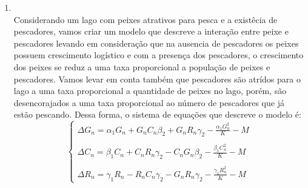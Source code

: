 \documentclass[a4paper]{article}
\begin{document}
\begin{enumerate}
$K$ \'e a capacidade de suporte do meio;\\
$M$ \'e a quantidade de indiv\'iduos que morrem por causas naturais (velhice, doen\c{c}a, cat\'astrofes, etc.).\\
\\
Os coeficientes $\alpha_1, \beta_1, \gamma_1$ representam a taxa de natalidade da espe\'ecie.\\
O efeito produzido pelo aparecimento de uma outra esp\'ecie, competi\c{c}\~ao inter-espec\'ifica, \'e proporcional ao produto dos termos das esp\'ecies multiplicado pelo fator de decrescimento da esp\'ecia presa. Neste modelo, estou supondo que o decrescimento ($\alpha_2, \beta_2, \gamma_2 $) n\~ao muda mesmo mudando a esp\'ecie predadora.\\
O coeficiente $\frac{P ^2}{K}$, onde $P$ \'e uma popula\c{c}\~ao qualquer, mede o efeito do crescimento de uma popula\c{c}\~ao pelo acr\'escimo de um novo indiv\'iduo.\\
Uma observa\c{c}\~ao relevante para a simula\c{c}\~ao do modelo \'e o valor dado aos coeficientes $\alpha$, $\beta$ e $\gamma$, pois cada esp\'ecie pode ter a capacidade de excluir a outra.\\
No caso de n\~ao existirem predadores, as presas crescem at\'e se estabilizarem devido a capacidade de suporte.\\
A popula\c{c}\~ao dos predadores diminuem na aus\^encia de presas.\\
\item
\\
Considerando um lago com peixes atrativos para pesca e a exist\^ecia de pescadores, vamos criar um modelo que descreve a intera\c{c}\~ao entre peixe e pescadores levando em considera\c{c}\~ao que na ausencia de pescadores os peixes possuem crescimento log\'istico e com a presen\c{c}a dos pescadores, o crescimento dos peixes se reduz a uma taxa proporcional a popula\c{c}\~ao de peixes e pescadores. Vamos levar em conta tamb\'em que pescadores s\~ao atr\'idos para o lago a uma taxa proporcional a quantidade de peixes no lago, por\'em, s\~ao desencorajados a uma taxa proporcional ao n\'umero de pescadores  que j\'a est\~ao pescando. Dessa forma, o sistema de equa\c{c}\~oes que descreve o modelo \'e:
\begin{equation}
\left\{\begin{array}{l}
\Delta G_n = \alpha_1 G_n + G_n C_n\beta_2 + G_n R_n\gamma_2 - \frac{\alpha_1 G_n ^2}{K}  - M\\
\\
\Delta C_n = \beta_1 C_n + C_n R_n\gamma_2 - C_n G_n\beta_2 - \frac{\beta_1 C_n ^2}{K} - M \\
\\
\Delta R_n = \gamma_1 R_n - R_n C_n\gamma_2 - G_n R_n\gamma_2 - \frac{\gamma_1 R_n ^2}{K} -M 
\end{array}
\end{equation}
\\


\end{enumerate}
\end{document}
